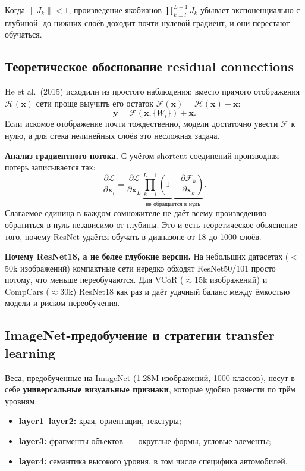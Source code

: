 \documentclass[10pt,a4paper]{report}
\numberwithin{equation}{chapter}
\numberwithin{figure}{chapter}
\numberwithin{table}{chapter}
\begin{document}
Когда $\|J_k\| < 1$, произведение якобианов $\prod_{k=l}^{L-1} J_k$
убывает экспоненциально с глубиной: до нижних слоёв доходит почти
нулевой градиент, и они перестают обучаться.

\subsection{Теоретическое обоснование residual connections}

He et al.~(2015) исходили из простого наблюдения: вместо прямого
отображения $\mathcal{H}(\mathbf{x})$ сети проще выучить его остаток
$\mathcal{F}(\mathbf{x}) = \mathcal{H}(\mathbf{x}) - \mathbf{x}$:
\begin{equation}
  \mathbf{y} = \mathcal{F}(\mathbf{x},\{W_i\}) + \mathbf{x}.
\end{equation}
Если искомое отображение почти тождественно, модели достаточно увести
$\mathcal{F}$ к нулю, а для стека нелинейных слоёв это несложная задача.

\textbf{Анализ градиентного потока.}
С учётом shortcut-соединений производная потерь записывается так:
\begin{equation}
  \frac{\partial\mathcal{L}}{\partial\mathbf{x}_l} =
  \frac{\partial\mathcal{L}}{\partial\mathbf{x}_L}
  \underbrace{\prod_{k=l}^{L-1}
    \!\left(1 + \frac{\partial\mathcal{F}_k}{\partial\mathbf{x}_k}
    \right)}_{\text{не обращается в нуль}}.
\end{equation}
Слагаемое-единица в каждом сомножителе не даёт всему произведению
обратиться в нуль независимо от глубины. Это и есть теоретическое
объяснение того, почему ResNet удаётся обучать в диапазоне от 18 до
1000 слоёв.

\textbf{Почему ResNet18, а не более глубокие версии.}
На небольших датасетах ($<$50k изображений) компактные сети нередко
обходят ResNet50/101 просто потому, что меньше переобучаются. Для
VCoR ($\approx$15k изображений) и CompCars ($\approx$30k) ResNet18 как
раз и даёт удачный баланс между ёмкостью модели и риском переобучения.

\subsection{ImageNet-предобучение и стратегии transfer learning}

Веса, предобученные на ImageNet (1.28M изображений, 1000 классов),
несут в себе \textbf{универсальные визуальные признаки}, которые удобно
разнести по трём уровням:
\begin{itemize}[nosep]
  \item \textbf{layer1--layer2:} края, ориентации, текстуры;
  \item \textbf{layer3:} фрагменты объектов~--- округлые формы, угловые
    элементы;
  \item \textbf{layer4:} семантика высокого уровня, в том числе
    специфика автомобилей.
\end{itemize}
\end{document}
